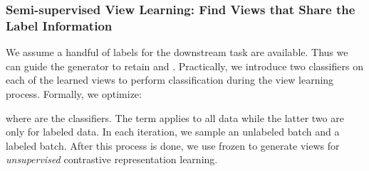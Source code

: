 \documentclass{article}
\begin{document}
\subsubsection{Semi-supervised View Learning: Find Views that Share the Label Information}\label{sec:semi}

We assume a handful of labels for the downstream task are available. Thus we can guide the generator  to retain  and . Practically, we introduce two classifiers on each of the learned views to perform classification during the view learning process. Formally, we optimize:

where  are the classifiers. The  term applies to all data while the latter two are only for labeled data. In each iteration, we sample an unlabeled batch and a labeled batch. After this process is done, we use frozen  to generate views for \emph{unsupervised} contrastive representation learning.
\end{document}
